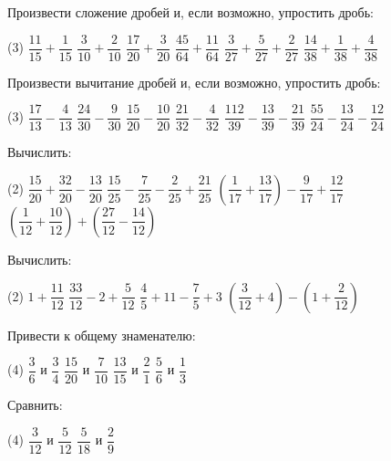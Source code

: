 \begin{class}[number=3]
	\begin{listofex}
	\item Произвести сложение дробей и, если возможно, упростить дробь:
	\begin{tasks}(3)
		\task \( \dfrac{11}{15}+\dfrac{1}{15} \)
		\task \( \dfrac{3}{10}+\dfrac{2}{10} \)
		\task \( \dfrac{17}{20}+\dfrac{3}{20} \)
		\task \( \dfrac{45}{64}+\dfrac{11}{64} \)
		\task \( \dfrac{3}{27}+\dfrac{5}{27}+\dfrac{2}{27} \)
		\task \( \dfrac{14}{38}+\dfrac{1}{38}+\dfrac{4}{38} \)
	\end{tasks}
	\item Произвести вычитание дробей и, если возможно, упростить дробь:
	\begin{tasks}(3)
		\task \( \dfrac{17}{13}-\dfrac{4}{13} \)
		\task \( \dfrac{24}{30}-\dfrac{9}{30} \)
		\task \( \dfrac{15}{20}-\dfrac{10}{20} \)
		\task \( \dfrac{21}{32}-\dfrac{4}{32} \)
		\task \( \dfrac{112}{39}-\dfrac{13}{39}-\dfrac{21}{39} \)
		\task \( \dfrac{55}{24}-\dfrac{13}{24}-\dfrac{12}{24} \)
	\end{tasks}
	\item Вычислить:
	\begin{tasks}(2)
		\task \( \dfrac{15}{20}+\dfrac{32}{20}-\dfrac{13}{20} \)
		\task \( \dfrac{15}{25}-\dfrac{7}{25}-\dfrac{2}{25}+\dfrac{21}{25} \)
		\task \( \left( \dfrac{1}{17}+\dfrac{13}{17} \right)-\dfrac{9}{17}+\dfrac{12}{17} \)
		\task \( \left( \dfrac{1}{12}+\dfrac{10}{12} \right)+\left( \dfrac{27}{12}-\dfrac{14}{12} \right) \)
	\end{tasks}
	\item Вычислить:
	\begin{tasks}(2)
		\task \( 1+\dfrac{11}{12} \)
		\task \( \dfrac{33}{12}-2+\dfrac{5}{12} \)
		\task \( \dfrac{4}{5}+11-\dfrac{7}{5}+3 \)
		\task \( \left( \dfrac{3}{12}+4 \right)-\left( 1+\dfrac{2}{12} \right) \)
	\end{tasks}
	\item Привести к общему знаменателю:
	\begin{tasks}(4)
		\task \( \dfrac{3}{6} \) и \( \dfrac{3}{4} \)
		\task \( \dfrac{15}{20} \) и \( \dfrac{7}{10} \)
		\task \( \dfrac{13}{15} \) и \( \dfrac{2}{1} \)
		\task \( \dfrac{5}{6} \) и \( \dfrac{1}{3} \)
	\end{tasks}
	\item Сравнить:
	\begin{tasks}(4)
		\task \( \dfrac{3}{12} \) и \( \dfrac{5}{12} \)
		\task \( \dfrac{5}{18} \) и \( \dfrac{2}{9} \)

\end{tasks}
\end{listofex}
\end{class}
